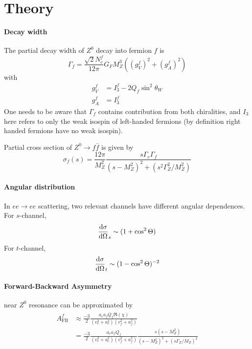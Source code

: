 \section{Theory}
\paragraph{Decay width}
The partial decay width of $Z^0$ decay into fermion $f$ is
\begin{equation}
	\Gamma_f = \frac{ \sqrt{2} N_c^f}{12\pi} G_F M_Z^3 \left( (g_V^f)^2 + (g_A^f)^2  \right)
	\label{math:Gammaf}
\end{equation}
with
\begin{align*}
	g_V^f &= I_3^f - 2 Q_f \sin^2 \theta_W \\
	g_A^f &= I_3^f 
\end{align*}
One needs to be aware that $\Gamma_f$ contains contribution from both chiralities, and $I_3$ here refers to only the weak isospin of left-handed fermions (by definition right handed fermions have no weak isospin).

Partial cross section of $Z^0 \rightarrow f\bar{f}$ is given by~\cite{manual}
\begin{equation}
	\sigma_f(s) = \frac{12 \pi}{M_Z^2} \frac{s \Gamma_e \Gamma_f}{ (s-M_Z^2)^2 + (s^2 \Gamma^2_Z / M_Z^2)}
\end{equation}

\paragraph{Angular distribution}
In $ee \rightarrow ee$ scattering, two relevant channels have different angular dependences. For $s$-channel,
\begin{equation}
	\dv{\sigma}{\Omega}_s \sim (1 + \cos^2 \Theta)
	\label{math:diffCrossS}
\end{equation}
For $t$-channel,
\begin{equation}
	\dv{\sigma}{\Omega}_t \sim (1-\cos^2 \Theta)^{-2}
	\label{math:diffCrossT}
\end{equation}


\paragraph{Forward-Backward Asymmetry} near $Z^0$ resonance can be approximated by
\begin{align}
	\begin{split}
	A_\text{FB}^f &\approx \frac{-3}{2} \frac{a_e a_f Q_f \Re(\chi)}{(v_e^2 + a_e^2) (v_f^2 + a_f^2)} \\
	&=  \frac{-3}{2} \frac{a_e a_f Q_f }{(v_e^2 + a_e^2) (v_f^2 + a_f^2)} \frac{s(s-M_Z^2)}{(s-M_Z^2)^2 + (s \Gamma_Z / M_Z)^2 }
	\end{split}
\end{align}

